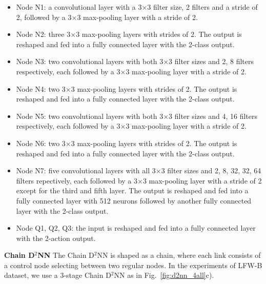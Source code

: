\documentclass[10pt,twocolumn,letterpaper]{article}
\newcommand{\smallparagraph}[1]{\smallskip \noindent \textbf{#1}}
\begin{document}
\begin{itemize}
\item Node N1: a convolutional layer with a 3$\times$3 filter size, 2 filters and a stride of 2,
  followed by a 3$\times$3 max-pooling layer with a stride of 2.
\item Node N2: three 3$\times$3 max-pooling layers with strides of 2. The output is reshaped and 
  fed into a fully connected layer with the 2-class output.
\item Node N3: two convolutional layers with both 3$\times$3 filter sizes and 2, 8 filters respectively,
  each followed by a 3$\times$3 max-pooling layer with a stride of 2.
\item Node N4: two 3$\times$3 max-pooling layers with strides of 2. The output is reshaped and 
  fed into a fully connected layer with the 2-class output.
\item Node N5: two convolutional layers with both 3$\times$3 filter sizes and 4, 16 filters respectively,
  each followed by a 3$\times$3 max-pooling layer with a stride of 2.
\item Node N6: two 3$\times$3 max-pooling layers with strides of 2. The output is reshaped and 
  fed into a fully connected layer with the 2-class output.
\item Node N7: five convolutional layers with all 3$\times$3 filter sizes and 2, 8, 32, 32, 64 filters repectively,
  each followed by a 3$\times$3 max-pooling layer with a stride of 2 except for the third and fifth layer. The output is reshaped
  and fed into a fully connected layer with 512 neurons followed by another fully connected
  layer with the 2-class output.
\item Node Q1, Q2, Q3: the input is reshaped
  and fed into a fully connected layer with the 2-action output.
\end{itemize}


\smallparagraph{Chain D$^2$NN}
The Chain D$^2$NN is shaped as a chain, where each link consists of a control node selecting between
two regular nodes. In the experiments of LFW-B dataset, we use a 3-stage Chain D$^2$NN as in Fig.~\ref{fig:d2nn_4all}c).
\end{document}
